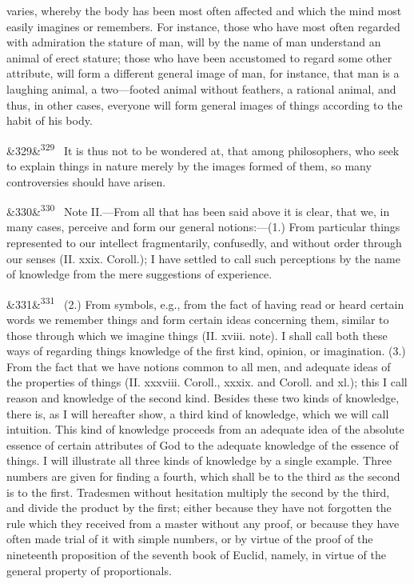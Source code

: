 \documentclass[12pt]{article}
\newcommand{\para}[1][]{\par\noindent\ifx&#1&\else\textsuperscript{\footnotesize #1}~\fi}
\begin{document}
varies, whereby the body has been most often affected and which the mind most easily imagines or remembers. For instance, those who have most often regarded with admiration the stature of man, will by the name of man understand an animal of erect stature; those who have been accustomed to regard some other attribute, will form a different general image of man, for instance, that man is a laughing animal, a two---footed animal without feathers, a rational animal, and thus, in other cases, everyone will form general images of things according to the habit of his body.

\para[329] It is thus not to be wondered at, that among philosophers, who seek to explain things in nature merely by the images formed of them, so many controversies should have arisen.

\para[330] Note II.---From all that has been said above it is clear, that we, in many cases, perceive and form our general notions:---(1.) From particular things represented to our intellect fragmentarily, confusedly, and without order through our senses (II. xxix. Coroll.); I have settled to call such perceptions by the name of knowledge from the mere suggestions of experience.

\para[331] (2.) From symbols, e.g., from the fact of having read or heard certain words we remember things and form certain ideas concerning them, similar to those through which we imagine things (II. xviii. note). I shall call both these ways of regarding things knowledge of the first kind, opinion, or imagination. (3.) From the fact that we have notions common to all men, and adequate ideas of the properties of things (II. xxxviii. Coroll., xxxix. and Coroll. and xl.); this I call reason and knowledge of the second kind. Besides these two kinds of knowledge, there is, as I will hereafter show, a third kind of knowledge, which we will call intuition. This kind of knowledge proceeds from an adequate idea of the absolute essence of certain attributes of God to the adequate knowledge of the essence of things. I will illustrate all three kinds of knowledge by a single example. Three numbers are given for finding a fourth, which shall be to the third as the second is to the first. Tradesmen without hesitation multiply the second by the third, and divide the product by the first; either because they have not forgotten the rule which they received from a master without any proof, or because they have often made trial of it with simple numbers, or by virtue of the proof of the nineteenth proposition of the seventh book of Euclid, namely, in virtue of the general property of proportionals.
\end{document}
